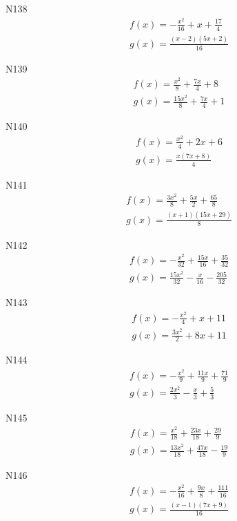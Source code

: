 \documentclass[11pt]{report}
\begin{document}
N138
\begin{align*}
 f(x) = - \frac{x^{2}}{16} + x + \frac{17}{4}\\
 g(x) = \frac{\left(x - 2\right) \left(5 x + 2\right)}{16}
\end{align*}

N139
\begin{align*}
 f(x) = \frac{x^{2}}{8} + \frac{7 x}{4} + 8\\
 g(x) = \frac{15 x^{2}}{8} + \frac{7 x}{4} + 1
\end{align*}

N140
\begin{align*}
 f(x) = \frac{x^{2}}{4} + 2 x + 6\\
 g(x) = \frac{x \left(7 x + 8\right)}{4}
\end{align*}

N141
\begin{align*}
 f(x) = \frac{3 x^{2}}{8} + \frac{5 x}{2} + \frac{65}{8}\\
 g(x) = \frac{\left(x + 1\right) \left(15 x + 29\right)}{8}
\end{align*}

N142
\begin{align*}
 f(x) = - \frac{x^{2}}{32} + \frac{15 x}{16} + \frac{35}{32}\\
 g(x) = \frac{15 x^{2}}{32} - \frac{x}{16} - \frac{205}{32}
\end{align*}

N143
\begin{align*}
 f(x) = - \frac{x^{2}}{4} + x + 11\\
 g(x) = \frac{3 x^{2}}{2} + 8 x + 11
\end{align*}

N144
\begin{align*}
 f(x) = - \frac{x^{2}}{9} + \frac{11 x}{9} + \frac{71}{9}\\
 g(x) = \frac{2 x^{2}}{3} - \frac{x}{3} + \frac{5}{3}
\end{align*}

N145
\begin{align*}
 f(x) = \frac{x^{2}}{18} + \frac{23 x}{18} + \frac{29}{9}\\
 g(x) = \frac{13 x^{2}}{18} + \frac{47 x}{18} - \frac{19}{9}
\end{align*}

N146
\begin{align*}
 f(x) = - \frac{x^{2}}{16} + \frac{9 x}{8} + \frac{111}{16}\\
 g(x) = \frac{\left(x - 1\right) \left(7 x + 9\right)}{16}
\end{align*}
\end{document}
